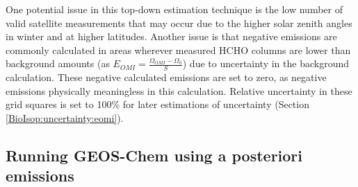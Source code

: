 \documentclass[acp, manuscript]{copernicus}
\newcommand{\Oomi}{\Omega_{OMI}} %
\newcommand{\apost}{E_{OMI}} %
\begin{document}
    
    
    One potential issue in this top-down estimation technique is the low number of valid satellite measurements that may occur due to the higher solar zenith angles in winter and at higher latitudes.
    Another issue is that negative emissions are commonly calculated in areas wherever measured HCHO columns are lower than background amounts (as $\apost = \frac{\Oomi - \Omega_0}{S}$) due to uncertainty in the background calculation.
    These negative calculated emissions are set to zero, as negative emissions physically meaningless in this calculation.
    Relative uncertainty in these grid squares is set to 100\% for later estimations of uncertainty (Section \ref{BioIsop:uncertainty:eomi}).
    
  
    
  \subsection{Running GEOS-Chem using a posteriori emissions}
  \label{BioIsop:method:scaled}
    
\end{document}
